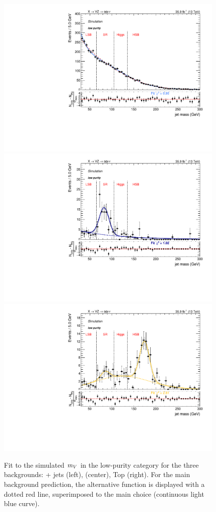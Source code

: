 \begin{figure}[!htb]
  \centering
    \includegraphics[width=.33\textwidth]{plotsAlpha_tesi/XVZnnlp/VjetMass.pdf}
    \includegraphics[width=.33\textwidth]{plotsAlpha_tesi/XVZnnlp/VVMass.pdf}
    \includegraphics[width=.33\textwidth]{plotsAlpha_tesi/XVZnnlp/TopMass.pdf}
  \caption{Fit to the simulated $m_V$ in the low-purity category for the three backgrounds: \V + jets (left), \VV (center), Top (right). For the main background prediction, the alternative function is displayed with a dotted red line, superimposed to the main choice (continuous light blue curve).}
  \label{fig:XVZnnlp_JetMass}
\end{figure}



